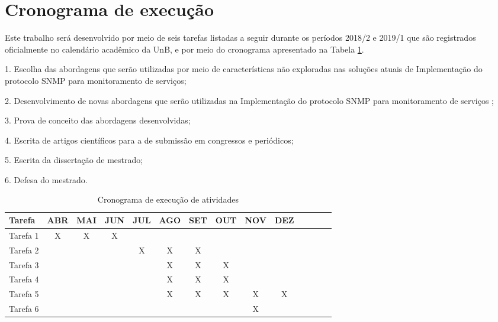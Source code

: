 \section{Cronograma de execução}

Este trabalho será desenvolvido por meio de seis tarefas listadas a seguir durante os períodos 2018/2 e 2019/1 que são registrados oficialmente no calendário acadêmico da UnB, e por meio do cronograma apresentado na Tabela \ref{tab:cronograma}.

	1. Escolha das abordagens que serão utilizadas por meio de características não exploradas nas soluções atuais de Implementação do protocolo SNMP para monitoramento de serviços;
  
  2. Desenvolvimento de novas abordagens que serão utilizadas na Implementação do protocolo SNMP para monitoramento de serviços ;
    
  3. Prova de conceito das abordagens desenvolvidas;
    
  4. Escrita de artigos científicos para a de submissão em congressos e periódicos;
  
  5. Escrita da dissertação de mestrado;
  
  6. Defesa do mestrado.

\begin{table}[!htpb]
	\centering
	\caption{Cronograma de execução de atividades}
	\begin{center}
		\begin{tabular}{|l|c|c|c|c|c|c|c|c|c|c|c|c|c|} \hline
Tarefa&ABR&MAI&JUN&JUL&AGO&SET&OUT&NOV&DEZ\\
			\hline
			Tarefa 1 &X&X&X& & & & & & \\
			\hline
			Tarefa 2 & & & &X&X&X& & & \\
			\hline
			Tarefa 3 & & & & &X&X&X& & \\
			\hline
			Tarefa 4 & & & & &X&X&X& & \\
			\hline
			Tarefa 5 & & & &&X&X&X&X&X \\
			\hline
			Tarefa 6 & & & & & & & & X& \\
			\hline
		\end{tabular}
		\label{tab:cronograma}
	\end{center}
\end{table} 


\selectfont%